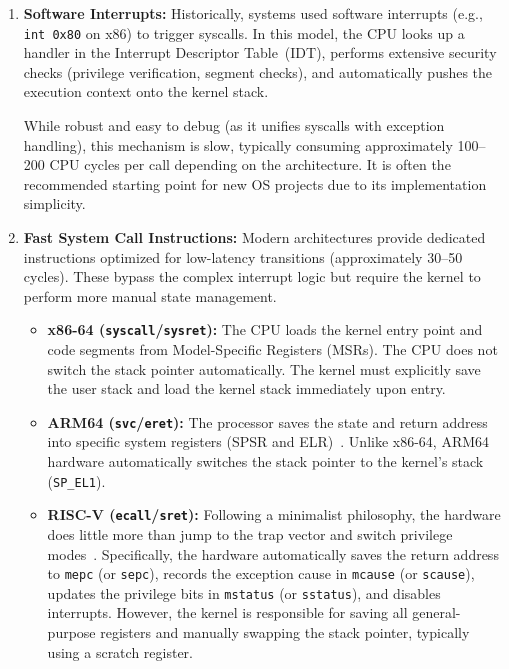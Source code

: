 \documentclass[a4paper,10pt,twoside]{report}
\theoremstyle{definition}
\begin{document}
\begin{enumerate}
    \item \textbf{Software Interrupts:} Historically, systems used software interrupts (e.g., \texttt{int 0x80} on x86) to trigger syscalls. In this model, the CPU looks up a handler in the Interrupt Descriptor Table~(IDT), performs extensive security checks (privilege verification, segment checks), and automatically pushes the execution context onto the kernel stack. 
    
    While robust and easy to debug (as it unifies syscalls with exception handling), this mechanism is slow, typically consuming approximately 100--200 CPU cycles per call depending on the architecture. It is often the recommended starting point for new OS projects due to its implementation simplicity.

    \item \textbf{Fast System Call Instructions:} Modern architectures provide dedicated instructions optimized for low-latency transitions (approximately 30--50 cycles). These bypass the complex interrupt logic but require the kernel to perform more manual state management.
    \begin{itemize}
        \item \textbf{x86-64 (\texttt{syscall}/\texttt{sysret}):} The CPU loads the kernel entry point and code segments from Model-Specific Registers (MSRs). The CPU does not switch the stack pointer automatically. The kernel must explicitly save the user stack and load the kernel stack immediately upon entry.
        \item \textbf{ARM64 (\texttt{svc}/\texttt{eret}):} The processor saves the state and return address into specific system registers (SPSR and ELR)~\cite{ARM-Arch-Ref-Exception-Levels}. Unlike x86-64, ARM64 hardware automatically switches the stack pointer to the kernel's stack (\texttt{SP\_EL1}).
        \item \textbf{RISC-V (\texttt{ecall}/\texttt{sret}):} Following a minimalist philosophy, the hardware does little more than jump to the trap vector and switch privilege modes~\cite{RISCV-Priv-Spec-System-Call}. Specifically, the hardware automatically saves the return address to \texttt{mepc} (or \texttt{sepc}), records the exception cause in \texttt{mcause} (or \texttt{scause}), updates the privilege bits in \texttt{mstatus} (or \texttt{sstatus}), and disables interrupts. However, the kernel is responsible for saving all general-purpose registers and manually swapping the stack pointer, typically using a scratch register.
    \end{itemize}
\end{enumerate}
\end{document}
